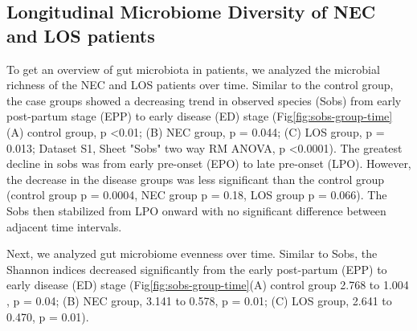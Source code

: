 \documentclass[fleqn,10pt, lineno]{wlpeerj} %
\begin{document}
   \subsection*{Longitudinal Microbiome Diversity of NEC and LOS patients}
    To get an overview of gut microbiota in patients, we analyzed the microbial richness of the NEC and LOS patients over time.  Similar to the control group, the case groups showed a decreasing trend in observed species (Sobs) from early post-partum stage (EPP) to early disease (ED) stage (Fig\ref{fig:sobs-group-time} (A) control group, p \textless 0.01; (B) NEC group, p = 0.044; (C) LOS group, p = 0.013; Dataset S1, Sheet "Sobs" two way RM ANOVA, p \textless 0.0001).  The greatest decline in sobs was from early pre-onset (EPO) to late pre-onset (LPO).  However, the decrease in the disease groups was less significant than the control group (control group p = 0.0004, NEC group p = 0.18, LOS group p = 0.066). The Sobs then stabilized from LPO onward with no significant difference between adjacent time intervals.


    Next, we analyzed gut microbiome evenness over time. Similar to Sobs, the Shannon indices decreased significantly from the early post-partum (EPP) to early disease (ED) stage (Fig\ref{fig:sobs-group-time}(A) control group 2.768 to 1.004 , p = 0.04; (B) NEC group, 3.141 to 0.578, p = 0.01; (C) LOS group, 2.641 to 0.470, p = 0.01).

\end{document}
